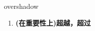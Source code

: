 
\begin{frame}
{\huge overshadow}
\begin{center}
\begin{enumerate}\Large
  \item \textbf{(在重要性上)超越，超过}
\end{enumerate}
\end{center}
\end{frame}

